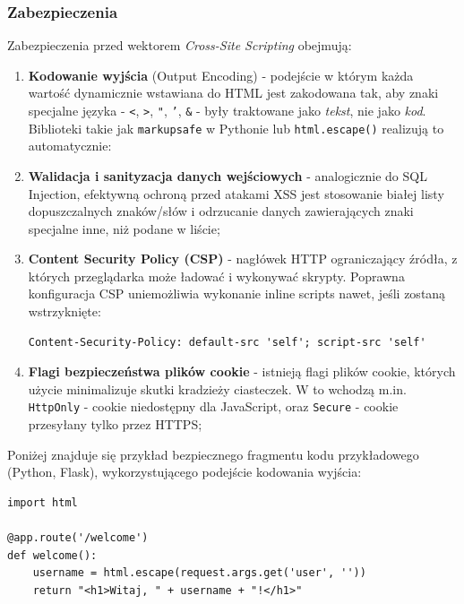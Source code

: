\documentclass[12pt,a4paper]{article}
\begin{document}
\subsubsection{Zabezpieczenia}
Zabezpieczenia przed wektorem \emph{Cross-Site Scripting} obejmują:
\begin{enumerate}
    \item \textbf{Kodowanie wyjścia} (Output Encoding) - podejście w którym każda wartość dynamicznie wstawiana do HTML
            jest zakodowana tak, aby znaki specjalne języka - \texttt{<}, \texttt{>}, \texttt{"}, \texttt{'}, \texttt{\&} -
            były traktowane jako \emph{tekst}, nie jako \emph{kod}. Biblioteki takie jak \texttt{markupsafe} w Pythonie
            lub \texttt{html.escape()} realizują to automatycznie:

    \item \textbf{Walidacja i sanityzacja danych wejściowych} - analogicznie do SQL Injection, efektywną ochroną przed atakami XSS jest stosowanie białej listy
            dopuszczalnych znaków/słów i odrzucanie danych zawierających znaki specjalne inne, niż podane w liście;

    \item \textbf{Content Security Policy (CSP)} - nagłówek HTTP ograniczający źródła, z których przeglądarka może ładować i wykonywać skrypty. 
            Poprawna konfiguracja CSP uniemożliwia wykonanie inline scripts nawet, jeśli zostaną wstrzyknięte:
\begin{tcolorbox}
\begin{verbatim}
Content-Security-Policy: default-src 'self'; script-src 'self'
\end{verbatim}
\end{tcolorbox}
    \item \textbf{Flagi bezpieczeństwa plików cookie} - istnieją flagi plików cookie, których użycie minimalizuje skutki kradzieży ciasteczek. W to wchodzą 
        m.in. \texttt{HttpOnly} - cookie niedostępny dla JavaScript, oraz \texttt{Secure} - cookie przesyłany tylko przez HTTPS;
\end{enumerate}

Poniżej znajduje się przykład bezpiecznego fragmentu kodu przykładowego (Python, Flask), wykorzystującego podejście kodowania wyjścia: 

\begin{tcolorbox}
\begin{verbatim}
import html

@app.route('/welcome')
def welcome():
    username = html.escape(request.args.get('user', ''))
    return "<h1>Witaj, " + username + "!</h1>"
\end{verbatim}
\end{tcolorbox}
\end{document}
